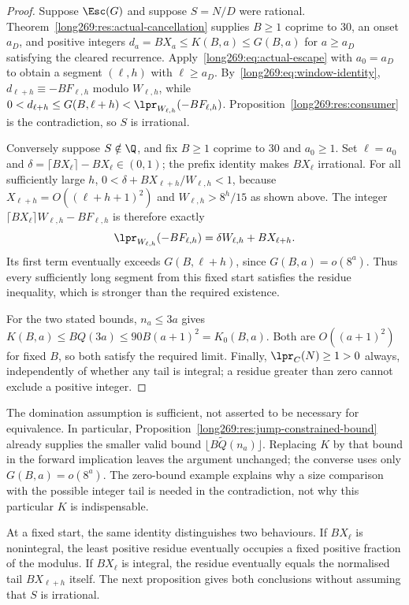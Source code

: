 \begin{proof}
Suppose $\Esc(G)$ and suppose $S=N/D$ were rational.
Theorem~\ref{long269:res:actual-cancellation} supplies $B\ge1$ coprime to $30$, an
onset $a_D$, and positive integers $d_a=BX_a\le K(B,a)\le G(B,a)$ for
$a\ge a_D$ satisfying the cleared recurrence.  Apply~\eqref{long269:eq:actual-escape}
with $a_0=a_D$ to obtain a segment $(\ell,h)$ with $\ell\ge a_D$.
By~\eqref{long269:eq:window-identity}, $d_{\ell+h}\equiv-BF_{\ell,h}$ modulo
$W_{\ell,h}$, while $0<d_{\ell+h}\le G(B,\ell+h)<\lpr_{W_{\ell,h}}(-BF_{\ell,h})$.
Proposition~\ref{long269:res:consumer} is the contradiction, so $S$ is irrational.

Conversely suppose $S\notin\Q$, and fix $B\ge1$ coprime to $30$ and
$a_0\ge1$.  Set $\ell=a_0$ and
$\delta=\lceil BX_\ell\rceil-BX_\ell\in(0,1)$; the prefix identity makes
$BX_\ell$ irrational.  For all sufficiently large $h$,
$0<\delta+BX_{\ell+h}/W_{\ell,h}<1$, because $X_{\ell+h}=O((\ell+h+1)^2)$ and
$W_{\ell,h}>8^h/15$ as shown above.
The integer $\lceil BX_\ell\rceil W_{\ell,h}-BF_{\ell,h}$ is therefore
exactly
\[
 \lpr_{W_{\ell,h}}(-BF_{\ell,h})
 =\delta W_{\ell,h}+BX_{\ell+h}.
\]
Its first term eventually exceeds $G(B,\ell+h)$, since
$G(B,a)=o(8^a)$.  Thus every sufficiently long segment from this fixed
start satisfies the residue inequality, which is stronger than the required existence.

For the two stated bounds, $n_a\le3a$ gives
$K(B,a)\le BQ(3a)\le90B(a+1)^2=K_0(B,a)$.
Both are $O((a+1)^2)$ for fixed $B$, so both satisfy the required limit.
Finally, $\lpr_C(N)\ge1>0$ always, independently of whether any tail is
integral; a residue greater than zero cannot exclude a positive integer.
\end{proof}

The domination assumption is sufficient, not asserted to be necessary
for equivalence.  In particular, Proposition~\ref{long269:res:jump-constrained-bound}
already supplies the smaller valid bound
$\lfloor B\widetilde Q(n_a)\rfloor$.  Replacing $K$ by that bound in the
forward implication leaves the argument unchanged; the converse uses only
$G(B,a)=o(8^a)$.  The zero-bound example explains why a size comparison
with the possible integer tail is needed in the contradiction, not why
this particular $K$ is indispensable.

At a fixed start, the same identity distinguishes two behaviours. If
$BX_\ell$ is nonintegral, the least positive residue eventually occupies
a fixed positive fraction of the modulus. If $BX_\ell$ is integral, the
residue eventually equals the normalised tail $BX_{\ell+h}$ itself.
The next proposition gives both conclusions without assuming that $S$
is irrational.

